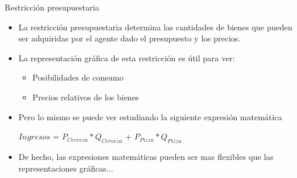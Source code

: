 \documentclass{beamer}
\begin{document}
\begin{frame}{Restricción presupuestaria}
    \begin{itemize}
        \item La restricción presupuestaria determina las cantidades de bienes que pueden ser adquiridas por el agente dado el presupuesto y los precios.
        \item La representación gráfica de esta restricción es útil para ver:
        \begin{itemize}
            \item Posibilidades de consumo
            \item Precios relativos de los bienes
        \end{itemize}
        \item Pero lo mismo se puede ver estudiando la siguiente expresión matemática \\ \vspace{2mm}
        \begin{center}
        $Ingresos$ = $P_{Cerveza} * Q_{Cerveza}$ + $P_{Pizza} * Q_{Pizza}$
        \end{center}\vspace{2mm}
        \item De hecho, las expresiones matemáticas pueden ser mas flexibles que las representaciones gráficas...
    \end{itemize} 
\end{frame}
    
\end{document}
